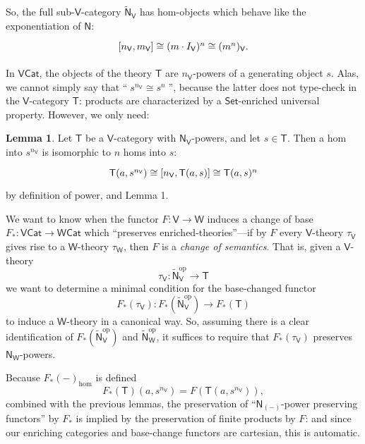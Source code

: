 \documentclass{amsart}
\theoremstyle{definition}
\newtheorem{lemma}[theorem]{Lemma}
\newcommand{\Set}{\mathsf{Set}}
\newcommand{\Cat}{\mathsf{Cat}}
\newcommand{\NN}{\mathsf{N}}
\newcommand{\V}{\mathsf{V}}
\newcommand{\W}{\mathsf{W}}
\newcommand{\T}{\mathsf{T}}
\newcommand{\op}{\mathrm{op}}
\newcommand{\maps}{\colon}
\begin{document}
So, the full sub-$\V$-category $\tilde{\NN}_\V$ has hom-objects which behave like the exponentiation of $\NN$:
\[\begin{tikzcd}
\left[n_\V,m_\V\right] \cong (m\cdot I_\V)^n \cong (m^n)_\V.
\end{tikzcd}\]

In $\V\Cat$, the objects of the theory $\T$ are $n_\V$-powers of a generating object $s$. Alas, we cannot simply say that ``$\;s^{n_\V} \cong s^n\;$'', because the latter does not type-check in the $\V$-category $\T$: products are characterized by a $\Set$-enriched universal property. However, we only need:

\begin{lemma}
	Let $\T$ be a $\V$-category with $\NN_\V$-powers, and let $s \in \T$. Then a hom into $s^{n_\V}$ is isomorphic to $n$ homs into $s$: 
\[\begin{tikzcd} \T(a,s^{n_\V}) \cong [n_\V,\T(a,s)] \cong \T(a,s)^n \end{tikzcd}\] 
by definition of power, and Lemma 1.
\end{lemma}

We want to know when the functor $F\maps\V \to \W$ induces a change of base $F_*\maps\V\Cat \to \W\Cat$ which ``preserves enriched-theories''---if by $F$ every $\V$-theory $\tau_\V$ gives rise to a $\W$-theory $\tau_\W$, then $F$ is a \textit{change of semantics}. That is, given a $\V$-theory $$\tau_\V\maps \tilde{\NN}_\V^\op \to \T$$ we want to determine a minimal condition for the base-changed functor $$F_*(\tau_\V)\maps F_*(\tilde{\NN}_\V^\op) \to F_*(\T)$$ to induce a $\W$-theory in a canonical way. So, assuming there is a clear identification of $F_*(\tilde{\NN}_\V^\op)$ and $\tilde{\NN}_\W^\op$, it suffices to require that $F_*(\tau_\V)$ preserves $\NN_\W$-powers.

Because $F_*(-)_{\text{hom}}$ is defined $$F_*(\T)(a,s^{n_\V}) = F(\T(a,s^{n_\V})),$$ combined with the previous lemmas, the preservation of ``$\NN_{(-)}$-power preserving functors'' by $F_*$ is implied by the preservation of finite products by $F$: and since our enriching categories and base-change functors are cartesian, this is automatic.
\end{document}
